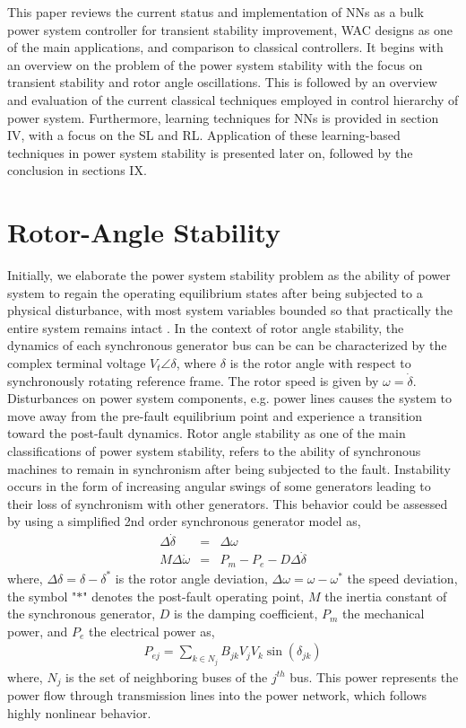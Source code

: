 \documentclass[journal]{IEEEtran}
\begin{document}
This paper reviews the current status and implementation of NNs as a bulk power system controller for transient stability improvement, WAC designs as one of the main applications, and comparison to classical controllers. It begins with an overview on the problem of the power system stability with the focus on transient stability and rotor angle oscillations. This is followed by an overview and evaluation of the current classical techniques employed in control hierarchy of power system. Furthermore, learning techniques for NNs is provided in section IV, with a focus on the SL and RL. Application of these learning-based techniques in power system stability is presented later on, followed by the conclusion in sections IX.



\section{Rotor-Angle Stability}
Initially, we elaborate the power system stability problem as the ability of power system to regain the operating equilibrium states after being subjected to a physical disturbance, with most system variables bounded so that practically the entire system remains intact \cite{STBase}. In the context of rotor angle stability, the dynamics of each synchronous generator bus can be can be characterized by the complex terminal voltage $V_t\angle \delta$, where $\delta$ is the rotor angle with respect to synchronously rotating reference frame. The rotor speed is given by $\omega=\dot{\delta}$. Disturbances on power system components, e.g. power lines causes the system to move away from the pre-fault equilibrium point and experience a transition toward the post-fault dynamics. Rotor angle stability as one of the main classifications of power system stability, refers to the ability of synchronous machines to remain in synchronism after being subjected to the fault. Instability occurs in the form of increasing angular swings of some generators leading to their loss of synchronism with other generators. This behavior could be assessed by using a simplified 2nd order synchronous generator model as,
\begin{eqnarray}
\Delta\dot{\delta}&=&\Delta \omega\\
M\Delta\dot{\omega}&=&P_m-P_e-D\Delta\dot{\delta}
\end{eqnarray}
where, $\Delta \delta= \delta-\delta^*$ is the rotor angle deviation, $\Delta \omega= \omega-\omega^*$ the speed deviation, the symbol "$*$" denotes the post-fault operating point, $M$ the inertia constant of the synchronous generator, $D$ is the damping coefficient, $P_m$ the mechanical power, and $P_e$ the electrical power as,
\begin{eqnarray}
P_{ej}=\sum\nolimits_{k \in N_j} B_{jk}{V}_{j}{V}_{k}\sin(\delta_{jk})
\end{eqnarray}
where, $N_j$ is the set of neighboring buses of the $j^{th}$ bus. This power represents the power flow through transmission lines into the power network, which follows highly nonlinear behavior.
\end{document}
